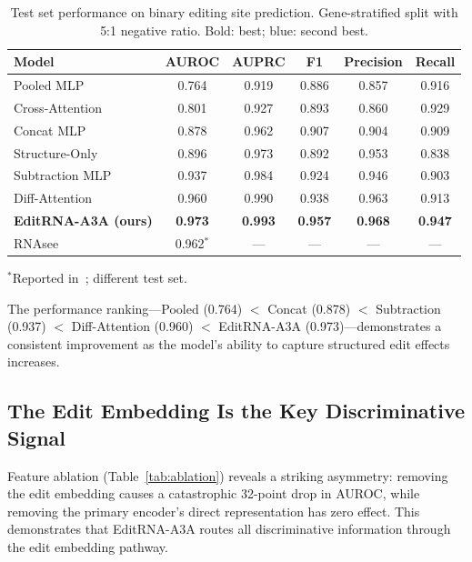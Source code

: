 \documentclass[11pt]{article}
\newcommand{\best}[1]{\textbf{\textcolor{best}{#1}}}
\newcommand{\second}[1]{\textcolor{second}{#1}}
\begin{document}
\begin{table}[htb]
\centering
\caption{Test set performance on binary editing site prediction. Gene-stratified
split with 5:1 negative ratio. Bold: best; blue: second best.}
\label{tab:main_results}
\begin{tabular}{@{}lccccc@{}}
\toprule
\textbf{Model} & \textbf{AUROC} & \textbf{AUPRC} & \textbf{F1} &
\textbf{Precision} & \textbf{Recall} \\
\midrule
Pooled MLP & 0.764 & 0.919 & 0.886 & 0.857 & 0.916 \\
Cross-Attention & 0.801 & 0.927 & 0.893 & 0.860 & 0.929 \\
Concat MLP & 0.878 & 0.962 & 0.907 & 0.904 & 0.909 \\
Structure-Only & 0.896 & 0.973 & 0.892 & 0.953 & 0.838 \\
Subtraction MLP & 0.937 & 0.984 & 0.924 & 0.946 & 0.903 \\
Diff-Attention & \second{0.960} & \second{0.990} & \second{0.938} &
  \second{0.963} & 0.913 \\
\midrule
\textbf{EditRNA-A3A (ours)} & \best{0.973} & \best{0.993} & \best{0.957} &
  \best{0.968} & \best{0.947} \\
\midrule
RNAsee~\citep{baysal2024} & 0.962$^*$ & --- & --- & --- & --- \\
\bottomrule
\end{tabular}

\vspace{2pt}
\footnotesize{$^*$Reported in~\citet{baysal2024}; different test set.}
\end{table}

The performance ranking---Pooled (0.764) $<$ Concat (0.878) $<$ Subtraction
(0.937) $<$ Diff-Attention (0.960) $<$ EditRNA-A3A (0.973)---demonstrates
a consistent improvement as the model's ability to capture structured edit
effects increases.

\subsection{The Edit Embedding Is the Key Discriminative Signal}

Feature ablation (Table~\ref{tab:ablation}) reveals a striking asymmetry:
removing the edit embedding causes a catastrophic 32-point drop in AUROC,
while removing the primary encoder's direct representation has zero effect.
This demonstrates that EditRNA-A3A routes all discriminative information through
the edit embedding pathway.
\end{document}
